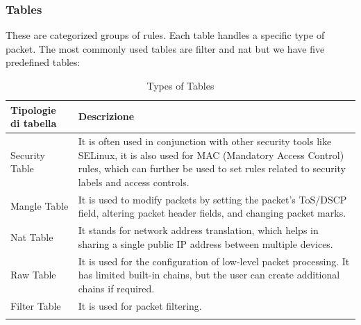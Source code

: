 \subsubsection{Tables}
These are categorized groups of rules. 
Each table handles a specific type of packet. 
The most commonly used tables are filter and nat but we have five predefined tables:  
\begin{center} 
\begin{longtable}{|p{}|p{}|} 
    \hline
    \textbf{Tipologie di tabella} & \textbf{Descrizione} \\
    \hline 
    Security Table & 
    It is often used in conjunction with other security tools like SELinux, 
    it is also used for MAC (Mandatory Access Control) rules, which can further be used to set rules 
    related to security labels and access controls. 
    \\
    \hline 
    Mangle Table & 
    It is used to modify packets by setting the packet's ToS/DSCP field, altering packet header 
    fields, and changing packet marks. 
    \\
    \hline 
    Nat Table & 
    It stands for network address translation, which helps in sharing a single 
    public IP address between multiple devices. 
    \\
    \hline 
    Raw Table & 
    It is used for the configuration of low-level packet processing.  
    It has limited built-in chains, but the user can create additional chains if required. 
    \item 
    \\
    \hline 
    Filter Table & 
    It is used for packet filtering. 
    \\
    \hline 
\caption{Types of Tables} 
\label{tabella:iptables:tipologie:tabelle} 
\end{longtable} 
\end{center}  

